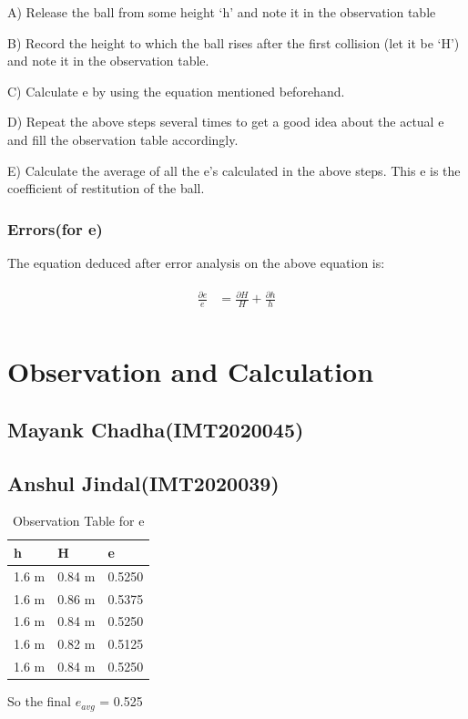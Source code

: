 \documentclass[11pt]{scrartcl} %
\begin{document}
A) Release the ball from some height ‘h’ and note it in the observation table \par

B) Record the height to which the ball rises after the first collision (let it be ‘H’) and note it in the observation table. \par

C) Calculate e by using the equation mentioned beforehand. \par

D) Repeat the above steps several times to get a good idea about the actual e and fill the observation table accordingly. \par

E) Calculate the average of all the e’s calculated in the above steps. This e is the coefficient of restitution of the ball. \par

\subsubsection{Errors(for e)}
The equation deduced after error analysis on the above equation is:\par

\begin{align} 
	\begin{split}
		\frac{\partial{e}}{e} &= \frac{\partial{H}}{H} + \frac{\partial{h}}{h}\\
	\end{split}					
\end{align}


\section{Observation and Calculation}
\subsection{Mayank Chadha(IMT2020045)}
\subsection{Anshul Jindal(IMT2020039)}
\begin{table}[h] %
	\centering %
	\begin{tabular}{l l l}
		\toprule
		\textbf{h} & \textbf{H} & \textbf{e} \\
		\midrule
		1.6 m & 0.84 m & 0.5250\\
        1.6 m & 0.86 m & 0.5375\\
        1.6 m & 0.84 m & 0.5250\\
        1.6 m & 0.82 m & 0.5125 \\
        1.6 m & 0.84 m & 0.5250 \\
		\bottomrule
	\end{tabular}
	\caption{Observation Table for e}
\end{table}
So the final $e_{avg}$ = 0.525
\end{document}
